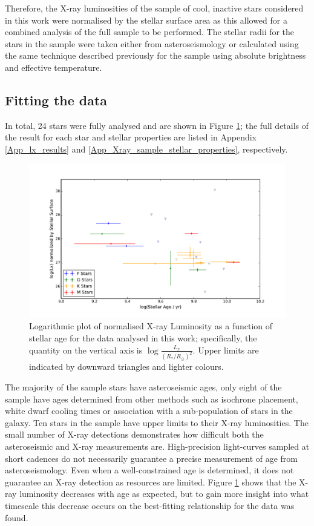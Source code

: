Therefore, the X-ray luminosities of the sample of cool, inactive stars considered in this work were normalised by the stellar surface area as this allowed for a combined analysis of the full sample to be performed. The stellar radii for the stars in the sample were taken either from asteroseismology or calculated using the same technique described previously for the \citet{Schmitt_Liefke_2004} sample using absolute brightness and effective temperature.

\subsection{Fitting the data}
In total, 24 stars were fully analysed and are shown in Figure \ref{fig:Xray_sample}; the full details of the result for each star and stellar properties are listed in Appendix \ref{App_lx_results} and \ref{App_Xray_sample_stellar_properties}, respectively. 

\begin{figure}
    \centering
    \includegraphics[scale=0.55]{Figures/3-Xray_age/xray_results.pdf}
    \caption[Plot of normalised X-ray luminosity as a function of age]{Logarithmic plot of normalised X-ray Luminosity as a function of stellar age for the data analysed in this work; specifically, the quantity on the vertical axis is $\log\frac{L_{x}}{(R_\ast/R_\odot)^{2}}$. Upper limits are indicated by downward triangles and lighter colours.}
    \label{fig:Xray_sample}
\end{figure}

The majority of the sample stars have asteroseismic ages, only eight of the sample have ages determined from other methods such as isochrone placement, white dwarf cooling times or association with a sub-population of stars in the galaxy. Ten stars in the sample have upper limits to their X-ray luminosities. The small number of X-ray detections demonstrates how difficult both the asteroseismic and X-ray measurements are. High-precision light-curves sampled at short cadences do not necessarily guarantee a precise measurement of age from asteroseismology. Even when a well-constrained age is determined, it does not guarantee an X-ray detection as resources are limited. Figure \ref{fig:Xray_sample} shows that the X-ray luminosity decreases with age as expected, but to gain more insight into what timescale this decrease occurs on the best-fitting relationship for the data was found.

